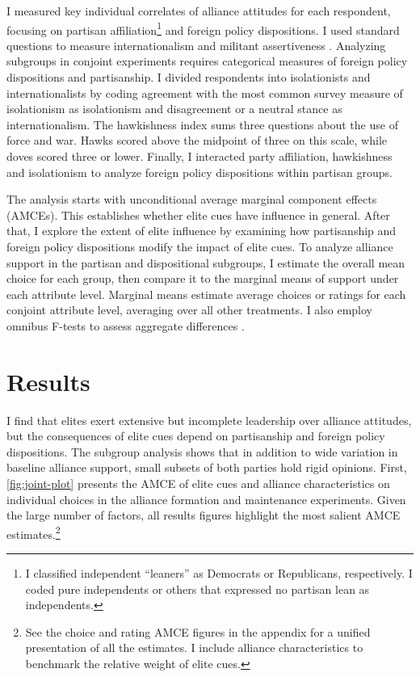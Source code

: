 \documentclass[12pt]{article}
\begin{document}
I measured key individual correlates of alliance attitudes for each respondent, focusing on partisan affiliation\footnote{I classified independent ``leaners'' as Democrats or Republicans, respectively. I coded pure independents or others that expressed no partisan lean as independents.} and foreign policy dispositions. 
I used standard questions to measure internationalism and militant assertiveness \citep{KertzerBrutger2016}.
Analyzing subgroups in conjoint experiments requires categorical measures of foreign policy dispositions and partisanship. 
I divided respondents into isolationists and internationalists by coding agreement with the most common survey measure of isolationism as isolationism and disagreement or a neutral stance as internationalism. 
The hawkishness index sums three questions about the use of force and war. 
Hawks scored above the midpoint of three on this scale, while doves scored three or lower. 
Finally, I interacted party affiliation, hawkishness and isolationism to analyze foreign policy dispositions within partisan groups.


The analysis starts with unconditional average marginal component effects (AMCEs).
This establishes whether elite cues have influence in general. 
After that, I explore the extent of elite influence by examining how partisanship and foreign policy dispositions modify the impact of elite cues. 
To analyze alliance support in the partisan and dispositional subgroups, I estimate the overall mean choice for each group, then compare it to the marginal means of support under each attribute level.
Marginal means estimate average choices or ratings for each conjoint attribute level, averaging over all other treatments. 
I also employ omnibus F-tests to assess aggregate differences \citep{Leeperetal2020}. 


\section{Results} 


I find that elites exert extensive but incomplete leadership over alliance attitudes, but the consequences of elite cues depend on partisanship and foreign policy dispositions.
The subgroup analysis shows that in addition to wide variation in baseline alliance support, small subsets of both parties hold rigid opinions. 
First, \autoref{fig:joint-plot} presents the AMCE of elite cues and alliance characteristics on individual choices in the alliance formation and maintenance experiments.
Given the large number of factors, all results figures highlight the most salient AMCE estimates.\footnote{See the choice and rating AMCE figures in the appendix for a unified presentation of all the estimates. I include alliance characteristics to benchmark the relative weight of elite cues.}
\end{document}

